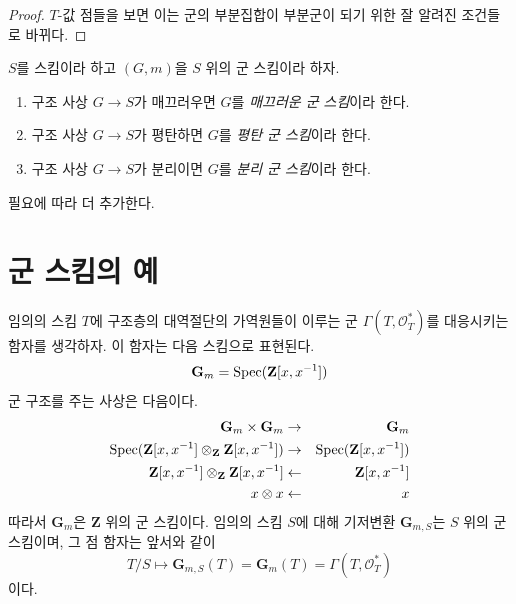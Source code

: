 \begin{proof}
$T$-값 점들을 보면 이는 군의 부분집합이 부분군이 되기 위한 잘 알려진 조건들로 바뀌다.
\end{proof}

\begin{definition}
\label{definition-smooth-group-scheme}
$S$를 스킴이라 하고 $(G, m)$을 $S$ 위의 군 스킴이라 하자.
\begin{enumerate}
\item 구조 사상 $G \to S$가 매끄러우면 $G$를 {\it 매끄러운 군 스킴}이라 한다.
\item 구조 사상 $G \to S$가 평탄하면 $G$를 {\it 평탄 군 스킴}이라 한다.
\item 구조 사상 $G \to S$가 분리이면 $G$를 {\it 분리 군 스킴}이라 한다.
\end{enumerate}
필요에 따라 더 추가한다.
\end{definition}






\section{군 스킴의 예}
\label{section-examples-group-schemes}

\begin{example}[곱셈군 스킴]
\label{example-multiplicative-group}
임의의 스킴 $T$에 구조층의 대역절단의 가역원들이 이루는 군
$\Gamma(T, \mathcal{O}_T^*)$를 대응시키는 함자를 생각하자. 이 함자는 다음 스킴으로 표현된다.
$$
\mathbf{G}_m = \mathop{\mathrm{Spec}}(\mathbf{Z}[x, x^{-1}])
$$
군 구조를 주는 사상은 다음이다.
\begin{eqnarray*}
\mathbf{G}_m \times \mathbf{G}_m & \to & \mathbf{G}_m \\
\mathop{\mathrm{Spec}}(\mathbf{Z}[x, x^{-1}] \otimes_{\mathbf{Z}} \mathbf{Z}[x, x^{-1}])
& \to &
\mathop{\mathrm{Spec}}(\mathbf{Z}[x, x^{-1}]) \\
\mathbf{Z}[x, x^{-1}] \otimes_{\mathbf{Z}} \mathbf{Z}[x, x^{-1}]
& \leftarrow &
\mathbf{Z}[x, x^{-1}] \\
x \otimes x & \leftarrow & x
\end{eqnarray*}
따라서 $\mathbf{G}_m$은 $\mathbf{Z}$ 위의 군 스킴이다. 임의의 스킴 $S$에 대해 기저변환
$\mathbf{G}_{m, S}$는 $S$ 위의 군 스킴이며, 그 점 함자는 앞서와 같이
$$
T/S
\longmapsto
\mathbf{G}_{m, S}(T) = \mathbf{G}_m(T) = \Gamma(T, \mathcal{O}_T^*)
$$
이다.
\end{example}

